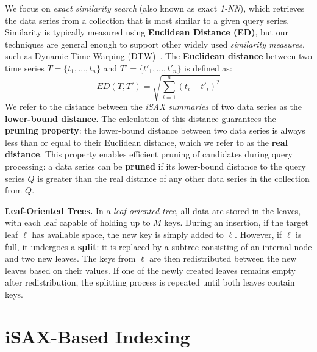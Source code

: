 We focus on \textit{exact similarity search} (also known as exact \textit{1-NN}),  
which retrieves the data series from a collection that is most similar to a given 
query series. Similarity is typically measured using \textbf{Euclidean Distance (ED)},
but our techniques are general enough to support other widely used 
\textit{similarity measures}, such as Dynamic Time Warping (DTW)~\cite{rakthanmanon2012searching}.  
% 
The \textbf{Euclidean distance} between two time series  
\( T = \{t_1, ... , t_n\} \) and \( T' = \{t'_1, ... , t'_n\} \)  
is defined as:  
\[
ED(T, T') = \sqrt{\sum_{i=1}^{n} (t_i - t'_i)^2}
\]  
% 
We refer to the distance between the \textit{iSAX summaries} of two data series  
as the \textbf{lower-bound distance}. 
% 
The calculation of this distance guarantees the \textbf{pruning property}:  
the lower-bound distance between two data series is always less than or equal to  
their Euclidean distance, which we refer to as the \textbf{real distance}.  
% 
This property enables efficient pruning of candidates during query processing:  
a data series can be \textbf{pruned} if its lower-bound distance to the query series
\( Q \) is greater than the real distance of any other data series in the collection 
from \( Q \).

\noindent
{\bf Leaf-Oriented Trees.}  
In a \textit{leaf-oriented tree}, all data are stored in the leaves, with each leaf
capable of holding up to \( M \) keys.  
% 
During an insertion, if the target leaf \( \ell \) has available space,  
the new key is simply added to \( \ell \).  
However, if \( \ell \) is full, it undergoes a \textbf{split}: it is replaced 
by a subtree consisting of an internal node and two new leaves.  
The keys from \( \ell \) are then redistributed between the new leaves based on
their values.  
% 
If one of the newly created leaves remains empty after redistribution,  
the splitting process is repeated until both leaves contain keys.  

\section{iSAX-Based Indexing}

